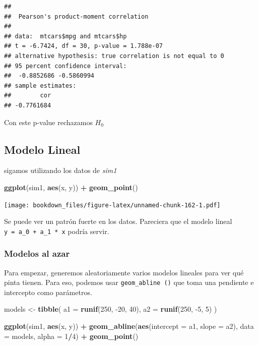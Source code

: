 \documentclass[]{book}
\newenvironment{Shaded}{\begin{snugshade}}{\end{snugshade}}
\newcommand{\DataTypeTok}[1]{\textcolor[rgb]{0.13,0.29,0.53}{#1}}
\newcommand{\DecValTok}[1]{\textcolor[rgb]{0.00,0.00,0.81}{#1}}
\newcommand{\KeywordTok}[1]{\textcolor[rgb]{0.13,0.29,0.53}{\textbf{#1}}}
\newcommand{\NormalTok}[1]{#1}
\newcommand{\OperatorTok}[1]{\textcolor[rgb]{0.81,0.36,0.00}{\textbf{#1}}}
\newcommand{\StringTok}[1]{\textcolor[rgb]{0.31,0.60,0.02}{#1}}
\begin{document}
\begin{verbatim}
## 
##  Pearson's product-moment correlation
## 
## data:  mtcars$mpg and mtcars$hp
## t = -6.7424, df = 30, p-value = 1.788e-07
## alternative hypothesis: true correlation is not equal to 0
## 95 percent confidence interval:
##  -0.8852686 -0.5860994
## sample estimates:
##        cor 
## -0.7761684
\end{verbatim}

Con este p-value rechazamos \(H_0\)

\hypertarget{modelo-lineal-1}{%
\subsection{Modelo Lineal}\label{modelo-lineal-1}}

sigamos utilizando los datos de \emph{sim1}

\begin{Shaded}
\begin{Highlighting}[]
\KeywordTok{ggplot}\NormalTok{(sim1, }\KeywordTok{aes}\NormalTok{(x, y)) }\OperatorTok{+}\StringTok{ }
\StringTok{  }\KeywordTok{geom_point}\NormalTok{()}
\end{Highlighting}
\end{Shaded}

\texttt{[image: bookdown\_files/figure-latex/unnamed-chunk-162-1.pdf]}

Se puede ver un patrón fuerte en los datos. Pareciera que el modelo lineal \texttt{y\ =\ a\_0\ +\ a\_1\ *\ x} podría servir.

\hypertarget{modelos-al-azar}{%
\subsubsection{Modelos al azar}\label{modelos-al-azar}}

Para empezar, generemos aleatoriamente varios modelos lineales para ver qué pinta tienen. Para eso, podemos usar \texttt{geom\_abline\ ()} que toma una pendiente e intercepto como parámetros.

\begin{Shaded}
\begin{Highlighting}[]
\NormalTok{models <-}\StringTok{ }\KeywordTok{tibble}\NormalTok{(}
  \DataTypeTok{a1 =} \KeywordTok{runif}\NormalTok{(}\DecValTok{250}\NormalTok{, }\DecValTok{-20}\NormalTok{, }\DecValTok{40}\NormalTok{),}
  \DataTypeTok{a2 =} \KeywordTok{runif}\NormalTok{(}\DecValTok{250}\NormalTok{, }\DecValTok{-5}\NormalTok{, }\DecValTok{5}\NormalTok{)}
\NormalTok{)}

\KeywordTok{ggplot}\NormalTok{(sim1, }\KeywordTok{aes}\NormalTok{(x, y)) }\OperatorTok{+}\StringTok{ }
\StringTok{  }\KeywordTok{geom_abline}\NormalTok{(}\KeywordTok{aes}\NormalTok{(}\DataTypeTok{intercept =}\NormalTok{ a1, }\DataTypeTok{slope =}\NormalTok{ a2), }\DataTypeTok{data =}\NormalTok{ models, }\DataTypeTok{alpha =} \DecValTok{1}\OperatorTok{/}\DecValTok{4}\NormalTok{) }\OperatorTok{+}
\StringTok{  }\KeywordTok{geom_point}\NormalTok{() }
\end{Highlighting}
\end{Shaded}
\end{document}
